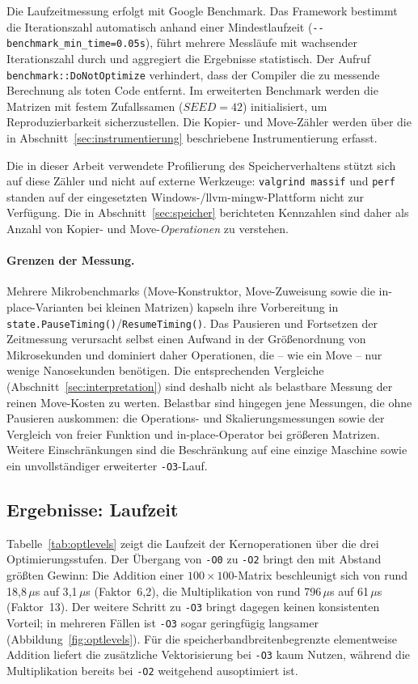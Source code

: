 \documentclass[10pt,a4paper]{article}
\begin{document}
Die Laufzeitmessung erfolgt mit Google Benchmark. Das Framework bestimmt die
Iterationszahl automatisch anhand einer Mindestlaufzeit
(\texttt{-{}-benchmark\_min\_time=0.05s}), führt mehrere Messläufe mit
wachsender Iterationszahl durch und aggregiert die Ergebnisse statistisch. Der
Aufruf \texttt{benchmark::DoNotOptimize} verhindert, dass der Compiler die zu
messende Berechnung als toten Code entfernt. Im erweiterten Benchmark werden die
Matrizen mit festem Zufallssamen ($\mathit{SEED}=42$) initialisiert, um
Reproduzierbarkeit sicherzustellen. Die Kopier- und Move-Zähler werden über die
in Abschnitt~\ref{sec:instrumentierung} beschriebene Instrumentierung erfasst.

Die in dieser Arbeit verwendete Profilierung des Speicherverhaltens stützt sich
auf diese Zähler und nicht auf externe Werkzeuge: \texttt{valgrind massif} und
\texttt{perf} standen auf der eingesetzten Windows-/llvm-mingw-Plattform nicht
zur Verfügung. Die in Abschnitt~\ref{sec:speicher} berichteten Kennzahlen sind
daher als Anzahl von Kopier- und Move-\emph{Operationen} zu verstehen.

\paragraph{Grenzen der Messung.}
Mehrere Mikrobenchmarks (Move-Konstruktor, Move-Zuweisung sowie die
in-place-Varianten bei kleinen Matrizen) kapseln ihre Vorbereitung in
\texttt{state.PauseTiming()}/\texttt{ResumeTiming()}. Das Pausieren und
Fortsetzen der Zeitmessung verursacht selbst einen Aufwand in der Größenordnung
von Mikrosekunden und dominiert daher Operationen, die -- wie ein Move -- nur
wenige Nanosekunden benötigen. Die entsprechenden Vergleiche
(Abschnitt~\ref{sec:interpretation}) sind deshalb nicht als belastbare Messung
der reinen Move-Kosten zu werten. Belastbar sind hingegen jene Messungen, die
ohne Pausieren auskommen: die Operations- und Skalierungsmessungen sowie der
Vergleich von freier Funktion und in-place-Operator bei größeren Matrizen.
Weitere Einschränkungen sind die Beschränkung auf eine einzige Maschine sowie
ein unvollständiger erweiterter \texttt{-O3}-Lauf.

\subsection{Ergebnisse: Laufzeit}
\label{sec:laufzeit}

Tabelle~\ref{tab:optlevels} zeigt die Laufzeit der Kernoperationen über die drei
Optimierungsstufen. Der Übergang von \texttt{-O0} zu \texttt{-O2} bringt den mit
Abstand größten Gewinn: Die Addition einer $100\times100$-Matrix beschleunigt
sich von rund 18{,}8\,$\mu$s auf 3{,}1\,$\mu$s (Faktor~6{,}2), die Multiplikation
von rund 796\,$\mu$s auf 61\,$\mu$s (Faktor~13). Der weitere Schritt zu
\texttt{-O3} bringt dagegen keinen konsistenten Vorteil; in mehreren Fällen ist
\texttt{-O3} sogar geringfügig langsamer (Abbildung~\ref{fig:optlevels}). Für die
speicherbandbreitenbegrenzte elementweise Addition liefert die zusätzliche
Vektorisierung bei \texttt{-O3} kaum Nutzen, während die Multiplikation bereits
bei \texttt{-O2} weitgehend ausoptimiert ist.
\end{document}
